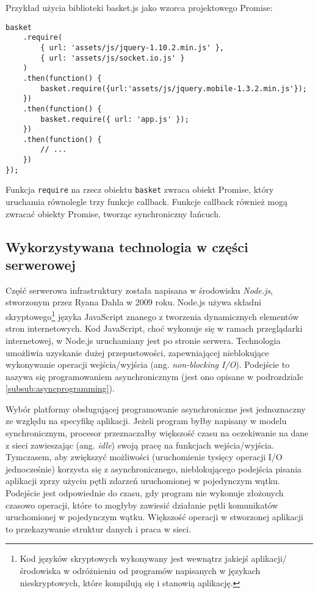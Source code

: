 Przykład użycia biblioteki basket.js jako wzorca projektowego Promise:

\lstset{language=JavaScript}
\begin{lstlisting}
basket
    .require(
		{ url: 'assets/js/jquery-1.10.2.min.js' },
		{ url: 'assets/js/socket.io.js' }
	)
    .then(function() {
        basket.require({url:'assets/js/jquery.mobile-1.3.2.min.js'});
    })
	.then(function() {
        basket.require({ url: 'app.js' });
    })
	.then(function() {
	 	// ...
	})
});
\end{lstlisting}

Funkcja \lstinline{require} na rzecz obiektu \lstinline{basket} zwraca obiekt Promise, który uruchamia równolegle trzy funkcje callback. Funkcje callback również mogą zwracać obiekty Promise, tworząc synchroniczny łańcuch.

\subsection{Wykorzystywana technologia w części serwerowej}
\label{sub:tool-server-technology}

Część serwerowa infrastruktury została napisana w środowisku \emph{Node.js}, stworzonym przez Ryana Dahla w 2009 roku. Node.js używa składni skryptowego\footnote{Kod języków skryptowych wykonywany jest wewnątrz jakiejś aplikacji/środowiska w odróżnieniu od programów napisanych w językach nieskryptowych, które kompilują się i stanowią aplikację.} języka JavaScript znanego z tworzenia dynamicznych elementów stron internetowych. Kod JavaScript, choć wykonuje się w ramach przeglądarki internetowej, w Node.js uruchamiany jest po stronie serwera. Technologia umożliwia uzyskanie dużej przepustowości, zapewniającej nieblokujące wykonywanie operacji wejścia/wyjścia (ang. \emph{non-blocking I/O}). Podejście to nazywa się programowaniem asynchronicznym (jest ono opisane w podrozdziale \ref{subsub:asyncprogramming}).

Wybór platformy obsługującej programowanie asynchroniczne jest jednoznaczny ze względu na specyfikę aplikacji. Jeżeli program byłby napisany w modelu synchronicznym, procesor przeznaczałby większość czasu na oczekiwanie na dane z sieci zawieszając (ang. \emph{idle}) swoją pracę na funkcjach wejścia/wyjścia. Tymczasem, aby zwiększyć możliwości (uruchomienie tysięcy operacji I/O jednocześnie) korzysta się z asynchronicznego, nieblokującego podejścia pisania aplikacji zprzy użyciu pętli zdarzeń uruchomionej w pojedynczym wątku. Podejście jest odpowiednie do czasu, gdy program nie wykonuje złożonych czasowo operacji, które to mogłyby zawiesić działanie pętli komunikatów uruchomionej w pojedynczym wątku. Większość operacji w stworzonej aplikacji to przekazywanie struktur danych i praca w sieci.


